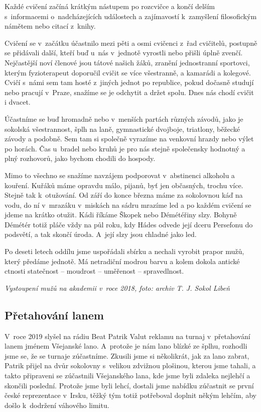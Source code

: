\documentclass[a5paper, 12pt, twoside]{article}
\begin{document}
Každé cvičení začíná krátkým nástupem po rozcvičce a končí delším
s~informacemi o~nadcházejících událostech a zajímavostí k~zamyšlení
filosofickým námětem nebo citací z~knihy.

Cvičení se v~začátku účastnilo mezi pěti a osmi cvičenci z~řad
cvičitelů, postupně se přidávali další, kteří buď u~nás v~jednotě
vyrostli nebo přišli úplně zvenčí. Nejčastější noví členové jsou tátové
našich žáků, zranění jednostranní sportovci, kterým fyzioterapeut
doporučil cvičit se více všestranně, a kamarádi a kolegové. Cvičí s~námi
sem tam hosté z~jiných jednot po republice, pokud dočasně studují nebo
pracují v~Praze, snažíme se je odchytit a držet spolu. Dnes nás chodí
cvičit i dvacet.

Účastníme se buď hromadně nebo v~menších partách různých závodů, jako je
sokolská všestrannost, šplh na laně, gymnastické dvojboje, triatlony,
běžecké závody a podobně. Sem tam si společně vyrazíme na venkovní
hrazdy nebo výlet po horách. Čas u~bradel nebo kruhů je pro nás stejně
společensky hodnotný a plný rozhovorů, jako bychom chodili do hospody.

Mimo to všechno se snažíme navzájem podporovat v~abstinenci alkoholu a
kouření. Kuřáků máme opravdu málo, pijanů, byť jen občasných, trochu
více. Stejně tak k~otužování. Od září do konce března máme za sokolovnou
káď na vodu, do ní v~mrazáku v~miskách na sádru mrazíme led a po každém
cvičení se jdeme na krátko otužit. Kádi říkáme Škopek nebo Démétéřiny
slzy. Bohyně Démétér totiž pláče vždy na půl roku, kdy Hádes odvede její
dceru Persefonu do podsvětí, a tak skončí úroda. A~její slzy jsou
chladné jako led.

Po deseti letech oddílu jsme uspořádali sbírku a nechali vyrobit prapor
mužů, který předáme jednotě. Má netradiční modrou barvu a kolem dokola
antické ctnosti statečnost -- moudrost -- uměřenost -- spravedlnost.


\textit{Vystoupení mužů na akademii v~roce 2018, foto: archiv T. J. Sokol
Libeň}

\subsection{Přetahování lanem}

V~roce 2019 slyšel na rádiu Beat Patrik Valut reklamu na turnaj
v~přetahování lanem jménem Všejanské lano. A~protože je nám lano blízké ze
šplhu, rozhodli jsme se, že se turnaje zúčastníme. Zkusili jsme si
několikrát, jak za lano zabrat, Patrik přijel na dvůr sokolovny
s~velikou zdvižnou plošinou, kterou jsme tahali, a takto připraveni se
zúčastnili Všejanského lana, kde jsme byli zdaleka nejlehčí a skončili
poslední. Protože jsme byli lehcí, dostali jsme nabídku zúčastnit se
první české reprezentace v~Irsku, těžký tým totiž potřeboval doplnit
někým lehčím, aby došlo k~dodržení váhového limitu.
\end{document}
